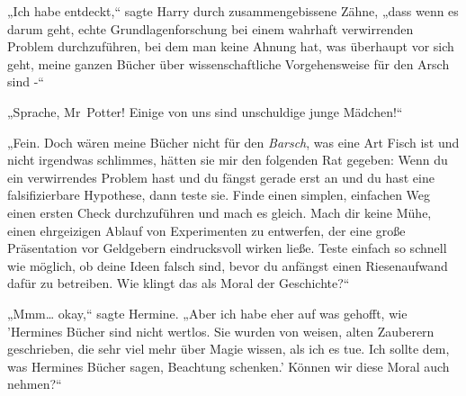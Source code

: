 „Ich habe entdeckt,“ sagte Harry durch zusammengebissene Zähne, „dass wenn es darum geht, echte Grundlagenforschung bei einem wahrhaft verwirrenden Problem durchzuführen, bei dem man keine Ahnung hat, was überhaupt vor sich geht, meine ganzen Bücher über wissenschaftliche Vorgehensweise für den Arsch sind -“

„Sprache, Mr~Potter! Einige von uns sind unschuldige junge Mädchen!“

„Fein. Doch wären meine Bücher nicht für den \emph{Barsch}, was eine Art Fisch ist und nicht irgendwas schlimmes, hätten sie mir den folgenden Rat gegeben: Wenn du ein verwirrendes Problem hast und du fängst gerade erst an und du hast eine falsifizierbare Hypothese, dann teste sie. Finde einen simplen, einfachen Weg einen ersten Check durchzuführen und mach es gleich. Mach dir keine Mühe, einen ehrgeizigen Ablauf von Experimenten zu entwerfen, der eine große Präsentation vor Geldgebern eindrucksvoll wirken ließe. Teste einfach so schnell wie möglich, ob deine Ideen falsch sind, bevor du anfängst einen Riesenaufwand dafür zu betreiben. Wie klingt das als Moral der Geschichte?“

„Mmm… okay,“ sagte Hermine. „Aber ich habe eher auf was gehofft, wie 'Hermines Bücher sind nicht wertlos. Sie wurden von weisen, alten Zauberern geschrieben, die sehr viel mehr über Magie wissen, als ich es tue. Ich sollte dem, was Hermines Bücher sagen, Beachtung schenken.' Können wir diese Moral auch nehmen?“

